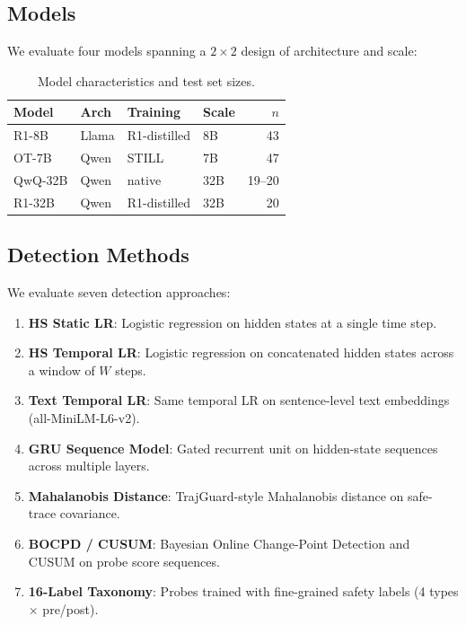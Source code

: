 \documentclass[11pt]{article}
\begin{document}
\subsection{Models}

We evaluate four models spanning a $2 \times 2$ design of architecture and scale:

\begin{table}[h]
\centering
\small
\begin{tabular}{llllr}
\toprule
\textbf{Model} & \textbf{Arch} & \textbf{Training} & \textbf{Scale} & \textbf{$n$} \\
\midrule
R1-8B & Llama & R1-distilled & 8B & 43 \\
OT-7B & Qwen & STILL & 7B & 47 \\
QwQ-32B & Qwen & native & 32B & 19--20 \\
R1-32B & Qwen & R1-distilled & 32B & 20 \\
\bottomrule
\end{tabular}
\caption{Model characteristics and test set sizes.}
\label{tab:models}
\end{table}

\subsection{Detection Methods}

We evaluate seven detection approaches:

\begin{enumerate}
\item \textbf{HS Static LR}: Logistic regression on hidden states at a single time step.
\item \textbf{HS Temporal LR}: Logistic regression on concatenated hidden states across a window of $W$ steps.
\item \textbf{Text Temporal LR}: Same temporal LR on sentence-level text embeddings (all-MiniLM-L6-v2).
\item \textbf{GRU Sequence Model}: Gated recurrent unit on hidden-state sequences across multiple layers.
\item \textbf{Mahalanobis Distance}: TrajGuard-style Mahalanobis distance on safe-trace covariance.
\item \textbf{BOCPD / CUSUM}: Bayesian Online Change-Point Detection and CUSUM on probe score sequences.
\item \textbf{16-Label Taxonomy}: Probes trained with fine-grained safety labels (4 types $\times$ pre/post).
\end{enumerate}
\end{document}
